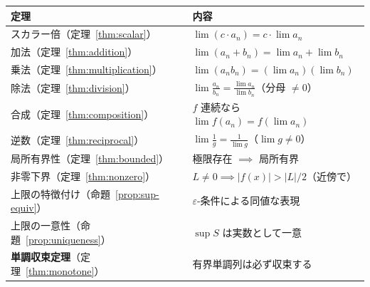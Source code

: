 \documentclass[11pt,a4paper]{jsarticle}
\theoremstyle{definition}
\newcommand{\eps}{\varepsilon}
\begin{document}
\begin{center}
\begin{tabular}{@{}ll@{}}
\toprule
\textbf{定理} & \textbf{内容} \\
\midrule
スカラー倍（定理~\ref{thm:scalar}） & $\lim (c \cdot a_n) = c \cdot \lim a_n$ \\
加法（定理~\ref{thm:addition}） & $\lim (a_n + b_n) = \lim a_n + \lim b_n$ \\
乗法（定理~\ref{thm:multiplication}） & $\lim (a_n b_n) = (\lim a_n)(\lim b_n)$ \\
除法（定理~\ref{thm:division}） & $\lim \frac{a_n}{b_n} = \frac{\lim a_n}{\lim b_n}$（分母 $\neq 0$） \\
合成（定理~\ref{thm:composition}） & $f$ 連続なら $\lim f(a_n) = f(\lim a_n)$ \\
逆数（定理~\ref{thm:reciprocal}） & $\lim \frac{1}{g} = \frac{1}{\lim g}$（$\lim g \neq 0$） \\
局所有界性（定理~\ref{thm:bounded}） & 極限存在 $\implies$ 局所有界 \\
非零下界（定理~\ref{thm:nonzero}） & $L \neq 0 \implies |f(x)| > |L|/2$（近傍で） \\
上限の特徴付け（命題~\ref{prop:sup-equiv}） & $\eps$-条件による同値な表現 \\
上限の一意性（命題~\ref{prop:uniqueness}） & $\sup S$ は実数として一意 \\
\textbf{単調収束定理}（定理~\ref{thm:monotone}） & 有界単調列は必ず収束する \\
\bottomrule
\end{tabular}
\end{center}
\end{document}
